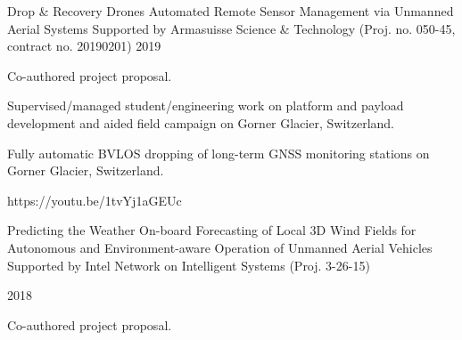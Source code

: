 \label{sec:proj}
\begin{cventries}

  \cvprojwideentry
  	{Drop \& Recovery Drones} %
  	{Automated Remote Sensor Management via Unmanned Aerial Systems} %
    {Supported by Armasuisse Science \& Technology (Proj. no. 050-45, contract no. 20190201)} %
    {2019} %
    {
      \begin{cvitems} %
        \item {Co-authored project proposal.}
        \item {Supervised/managed student/engineering work on platform and payload development and aided field campaign on Gorner Glacier, Switzerland.}
        \item {Fully automatic BVLOS dropping of long-term GNSS monitoring stations on Gorner Glacier, Switzerland.}
      \end{cvitems}
    } %
    {https://youtu.be/1tvYj1aGEUc} %
    {\showprojectdescriptions}

  \cvprojwideentry
  	{Predicting the Weather} %
  	{On-board Forecasting of Local 3D Wind Fields for Autonomous and
Environment-aware Operation of Unmanned Aerial Vehicles} %
    {Supported by Intel Network on Intelligent Systems (Proj. 3-26-15)} %
    {\parbox{\linewidth}{2018\linebreak}} %
    {
      \begin{cvitems} %
        \item {Co-authored project proposal.}
      \end{cvitems}
    } %
    {} %
    {\showprojectdescriptions}

\vspace{-9pt}


\end{cventries}
